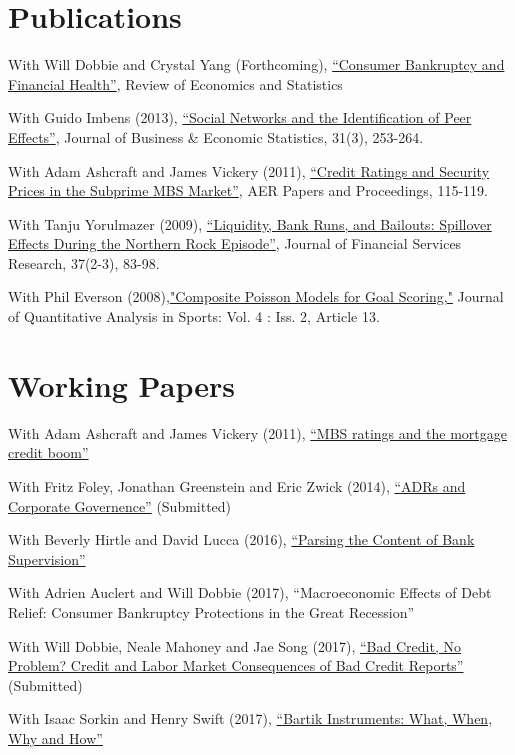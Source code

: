 \documentclass[letterpaper]{article}
\renewenvironment{itemize}{
  \begin{list}{}
    { \setlength{\itemsep}{5pt}
      \setlength{\parsep}{0pt}
      \setlength{\topsep}{0pt}
      \setlength{\leftmargin}{0em} } }{
  \end{list}}
\begin{document}
\section*{Publications}

\begin{itemize}
\item With Will Dobbie and Crystal Yang (Forthcoming), \href{http://www.nber.org/papers/w21032}{``Consumer Bankruptcy and Financial Health''}, Review of Economics and Statistics
\item With Guido Imbens (2013), \href{http://www.tandfonline.com/doi/pdf/10.1080/07350015.2013.801251}{``Social Networks and the Identification of Peer Effects''}, Journal of Business \& Economic Statistics, 31(3), 253-264.
\item With Adam Ashcraft and James Vickery (2011), \href{http://papers.ssrn.com.ezp-prod1.hul.harvard.edu/sol3/papers.cfm?abstract_id=1856823}{``Credit Ratings
    and Security Prices in the Subprime MBS Market''}, AER Papers and Proceedings,  115-119. 
\item With Tanju Yorulmazer (2009), \href{http://www.springerlink.com/content/ww187761jgr660q5/}{``Liquidity, Bank Runs, and Bailouts: Spillover Effects During the Northern Rock Episode''}, Journal of Financial Services Research, 37(2-3), 83-98. 
\item With Phil Everson (2008),\href{http://www.bepress.com/jqas/vol4/iss2/13/}{"Composite Poisson Models for Goal Scoring,"} Journal of Quantitative Analysis in Sports: Vol. 4 : Iss. 2, Article 13.
\end{itemize}

\section*{Working Papers}

\begin{itemize}
\item With Adam Ashcraft and James Vickery (2011), \href{http://papers.ssrn.com/sol3/papers.cfm?abstract_id=1615613}{``MBS ratings and
  the mortgage credit boom''}
\item With Fritz Foley, Jonathan Greenstein and Eric Zwick (2014), \href{http://www.nber.org/papers/w19953}{``ADRs and Corporate Governence''} (Submitted)
\item With Beverly Hirtle and David Lucca (2016), \href{https://www.newyorkfed.org/research/staff_reports/sr770.html}{``Parsing the Content of Bank Supervision''}
\item With Adrien Auclert and Will Dobbie (2017), ``Macroeconomic Effects of Debt Relief: Consumer Bankruptcy Protections in the Great Recession''
\item With Will Dobbie, Neale Mahoney and Jae Song (2017), \href{https://papers.ssrn.com/sol3/papers.cfm?abstract_id=2844316}{``Bad Credit, No Problem? Credit and Labor Market Consequences of Bad Credit Reports''} (Submitted)
\item With Isaac Sorkin and Henry Swift (2017), \href{http://paulgp.github.io/papers/bartik_gpss.pdf}{``Bartik Instruments: What, When, Why and How''}
\end{itemize}
\end{document}
